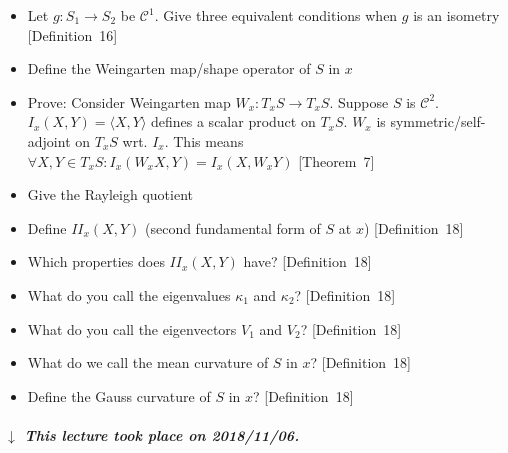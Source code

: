 \documentclass{article}
\numberwithin{lecref}{section}
\newcommand{\dateref}[1]{%
  \begin{mdframed}[backgroundcolor=gray!10,innerbottommargin=0pt,innertopmargin=0pt]
    \paragraph{\textit{$\downarrow$ This lecture took place on #1.}}%
  \end{mdframed}%
}
\begin{document}
\begin{itemize}
  \item Let $g: S_1 \to S_2$ be $\mathcal C^1$. Give three equivalent conditions when $g$ is an isometry [Definition~16]
  \item Define the Weingarten map/shape operator of $S$ in $x$
  \item Prove: Consider Weingarten map $W_x: T_x S \to T_x S$. Suppose $S$ is $\mathcal C^2$. $I_x(X, Y) = \langle X, Y\rangle$ defines a scalar product on $T_x S$. $W_x$ is symmetric/self-adjoint on $T_x S$ wrt. $I_x$. This means $\forall X, Y \in T_x S: I_x(W_x X, Y) = I_x(X, W_x Y)$ [Theorem~7]
  \item Give the Rayleigh quotient
  \item Define $II_x(X, Y)$ (second fundamental form of $S$ at $x$) [Definition~18]
  \item Which properties does $II_x(X, Y)$ have? [Definition~18]
  \item What do you call the eigenvalues $\kappa_1$ and $\kappa_2$? [Definition~18]
  \item What do you call the eigenvectors $V_1$ and $V_2$? [Definition~18]
  \item What do we call the mean curvature of $S$ in $x$? [Definition~18]
  \item Define the Gauss curvature of $S$ in $x$? [Definition~18]
\end{itemize}

\dateref{2018/11/06}
\end{document}
